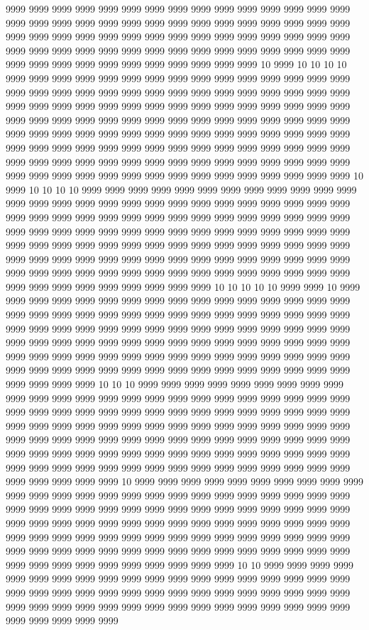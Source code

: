9999 9999 9999 9999 9999 9999 9999 9999 9999 9999 9999 9999 9999 9999 9999 9999 9999 9999 9999 9999 9999 9999 9999 9999 9999 9999 9999 9999 9999 9999 9999 9999 9999 9999 9999 9999 9999 9999 9999 9999 9999 9999 9999 9999 9999 9999 9999 9999 9999 9999 9999 9999 9999 9999 9999 9999 9999 9999 9999 9999 9999 9999 9999 9999 9999 9999 9999 9999 9999 9999 9999 10 9999 10 10 10 10 9999 9999 9999 9999 9999 9999 9999 9999 9999 9999 9999 9999 9999 9999 9999 9999 9999 9999 9999 9999 9999 9999 9999 9999 9999 9999 9999 9999 9999 9999 9999 9999 9999 9999 9999 9999 9999 9999 9999 9999 9999 9999 9999 9999 9999 9999 9999 9999 9999 9999 9999 9999 9999 9999 9999 9999 9999 9999 9999 9999 9999 9999 9999 9999 9999 9999 9999 9999 9999 9999 9999 9999 9999 9999 9999 9999 9999 9999 9999 9999 9999 9999 9999 9999 9999 9999 9999 9999 9999 9999 9999 9999 9999 9999 9999 9999 9999 9999 9999 9999 9999 9999 9999 9999 9999 9999 9999 9999 9999 9999 9999 9999 9999 9999 9999 9999 9999 9999 9999 9999 10 9999 10 10 10 10 9999 9999 9999 9999 9999 9999 9999 9999 9999 9999 9999 9999 9999 9999 9999 9999 9999 9999 9999 9999 9999 9999 9999 9999 9999 9999 9999 9999 9999 9999 9999 9999 9999 9999 9999 9999 9999 9999 9999 9999 9999 9999 9999 9999 9999 9999 9999 9999 9999 9999 9999 9999 9999 9999 9999 9999 9999 9999 9999 9999 9999 9999 9999 9999 9999 9999 9999 9999 9999 9999 9999 9999 9999 9999 9999 9999 9999 9999 9999 9999 9999 9999 9999 9999 9999 9999 9999 9999 9999 9999 9999 9999 9999 9999 9999 9999 9999 9999 9999 9999 9999 9999 9999 9999 9999 9999 9999 9999 9999 9999 9999 10 10 10 10 10 9999 9999 10 9999 9999 9999 9999 9999 9999 9999 9999 9999 9999 9999 9999 9999 9999 9999 9999 9999 9999 9999 9999 9999 9999 9999 9999 9999 9999 9999 9999 9999 9999 9999 9999 9999 9999 9999 9999 9999 9999 9999 9999 9999 9999 9999 9999 9999 9999 9999 9999 9999 9999 9999 9999 9999 9999 9999 9999 9999 9999 9999 9999 9999 9999 9999 9999 9999 9999 9999 9999 9999 9999 9999 9999 9999 9999 9999 9999 9999 9999 9999 9999 9999 9999 9999 9999 9999 9999 9999 9999 9999 9999 9999 9999 9999 9999 9999 10 10 10 9999 9999 9999 9999 9999 9999 9999 9999 9999 9999 9999 9999 9999 9999 9999 9999 9999 9999 9999 9999 9999 9999 9999 9999 9999 9999 9999 9999 9999 9999 9999 9999 9999 9999 9999 9999 9999 9999 9999 9999 9999 9999 9999 9999 9999 9999 9999 9999 9999 9999 9999 9999 9999 9999 9999 9999 9999 9999 9999 9999 9999 9999 9999 9999 9999 9999 9999 9999 9999 9999 9999 9999 9999 9999 9999 9999 9999 9999 9999 9999 9999 9999 9999 9999 9999 9999 9999 9999 9999 9999 9999 9999 9999 9999 9999 9999 9999 9999 9999 9999 9999 9999 9999 9999 10 9999 9999 9999 9999 9999 9999 9999 9999 9999 9999 9999 9999 9999 9999 9999 9999 9999 9999 9999 9999 9999 9999 9999 9999 9999 9999 9999 9999 9999 9999 9999 9999 9999 9999 9999 9999 9999 9999 9999 9999 9999 9999 9999 9999 9999 9999 9999 9999 9999 9999 9999 9999 9999 9999 9999 9999 9999 9999 9999 9999 9999 9999 9999 9999 9999 9999 9999 9999 9999 9999 9999 9999 9999 9999 9999 9999 9999 9999 9999 9999 9999 9999 9999 9999 9999 9999 9999 9999 9999 9999 9999 9999 9999 9999 9999 10 10 9999 9999 9999 9999 9999 9999 9999 9999 9999 9999 9999 9999 9999 9999 9999 9999 9999 9999 9999 9999 9999 9999 9999 9999 9999 9999 9999 9999 9999 9999 9999 9999 9999 9999 9999 9999 9999 9999 9999 9999 9999 9999 9999 9999 9999 9999 9999 9999 9999 9999 9999 9999 9999 9999 